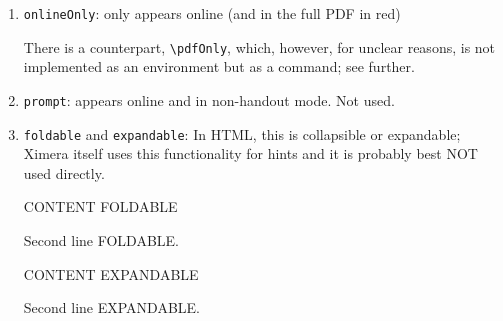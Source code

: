 \documentclass{ximera}
\begin{document}
\begin{enumerate}
    Technical detail: \verb|feedback| was internally misused to implement \verb|oplossing| (as \verb|\begin{feedback}{solution}|). However, as of 5/2023, there is an alternative and simpler implementation using pure CSS, via preamble.tex/global.css and .ximera/ximera.4ht, only in the summer course math/idl (and nowhere else at that time).

       
    \item \verb|onlineOnly|: only appears online (and in the full PDF in red)

    There is a counterpart, \verb|\pdfOnly|, which, however, for unclear reasons, is not implemented as an environment but as a command; see further.

    \item \verb|prompt|: appears online and in non-handout mode. Not used. 

    \item \verb|foldable| and \verb|expandable|: In HTML, this is collapsible or expandable; Ximera itself uses this functionality for hints and it is probably best NOT used directly. 

    \begin{foldable}
        CONTENT FOLDABLE

        Second line FOLDABLE.
    \end{foldable}

    \begin{expandable}
        CONTENT EXPANDABLE

        Second line EXPANDABLE.        
    \end{expandable} 





    


\end{enumerate}
\end{document}
